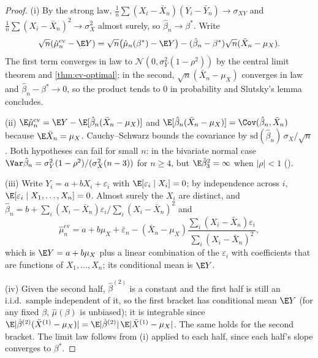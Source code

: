 \begin{proof}
(i) By the strong law, $\frac1n\sum(X_i-\bar X_n)(Y_i-\bar Y_n)\to\sigma_{XY}$ and
$\frac1n\sum(X_i-\bar X_n)^2\to\sigma_X^2$ almost surely, so $\hat\beta_n\to\beta^*$. Write
\[
  \sqrt n(\hat\mu^{\mathrm{cv}}_n-\E Y)=\sqrt n\big(\hat\mu_n(\beta^*)-\E Y\big)
  -(\hat\beta_n-\beta^*)\sqrt n(\bar X_n-\mu_X).
\]
The first term converges in law to $\mathcal N(0,\sigma_Y^2(1-\rho^2))$ by the central limit
theorem and \cref{thm:cv-optimal}; in the second, $\sqrt n(\bar X_n-\mu_X)$ converges in law
and $\hat\beta_n-\beta^*\to0$, so the product tends to $0$ in probability and Slutsky's lemma
\citep[Lemma~2.8]{vandervaart-asymptotic} concludes.

(ii) $\E\hat\mu^{\mathrm{cv}}_n=\E Y-\E[\hat\beta_n(\bar X_n-\mu_X)]$ and
$\E[\hat\beta_n(\bar X_n-\mu_X)]=\Cov(\hat\beta_n,\bar X_n)$ because $\E\bar X_n=\mu_X$.
Cauchy--Schwarz bounds the covariance by $\mathrm{sd}(\hat\beta_n)\,\sigma_X/\sqrt n$. Both
hypotheses can fail for small $n$: in the bivariate normal case
$\Var\hat\beta_n=\sigma_Y^2(1-\rho^2)/(\sigma_X^2(n-3))$ for $n\ge4$, but
$\E\hat\beta_3^2=\infty$ when $|\rho|<1$ ().

(iii) Write $Y_i=a+bX_i+\varepsilon_i$ with $\E[\varepsilon_i\mid X_i]=0$; by independence
across $i$, $\E[\varepsilon_i\mid X_1,\dots,X_n]=0$. Almost surely the $X_i$ are distinct, and
$\hat\beta_n=b+\sum_i(X_i-\bar X_n)\varepsilon_i/\sum_i(X_i-\bar X_n)^2$ and
\[
  \hat\mu^{\mathrm{cv}}_n=a+b\mu_X+\bar\varepsilon_n-(\bar X_n-\mu_X)\frac{\sum_i(X_i-\bar X_n)\varepsilon_i}{\sum_i(X_i-\bar X_n)^2},
\]
which is $\E Y=a+b\mu_X$ plus a linear combination of the $\varepsilon_i$ with
coefficients that are functions of $X_1,\dots,X_n$; its conditional mean is $\E Y$.

(iv) Given the second half, $\hat\beta^{(2)}$ is a constant and the first half is still an
i.i.d.\ sample independent of it, so the first bracket has conditional mean $\E Y$ (for any
fixed $\beta$, $\hat\mu(\beta)$ is unbiased); it is integrable since
$\E|\hat\beta^{(2)}(\bar X^{(1)}-\mu_X)|=\E|\hat\beta^{(2)}|\,\E|\bar X^{(1)}-\mu_X|$. The same
holds for the second bracket. The limit law follows from (i) applied to each half, since
each half's slope converges to $\beta^*$.
\end{proof}

